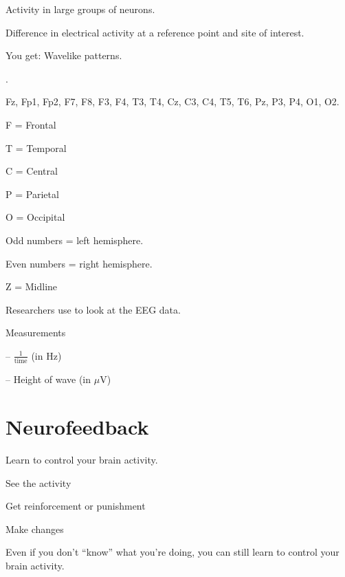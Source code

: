\begin{coloredlist}
    \item Activity in large groups of neurons.
    \item Difference in electrical activity at a reference point and site of interest.
    \item You get: Wavelike patterns.
    \item {}.
    \begin{coloredlist}
        \item Fz, Fp1, Fp2, F7, F8, F3, F4, T3, T4, Cz, C3, C4, T5, T6, Pz, P3, P4, O1, O2.
        \begin{multicols}{2}
            \begin{coloredlist}
                \item F = Frontal
                \item T = Temporal
                \item C = Central
                \item P = Parietal
                \item O = Occipital
                \item Odd numbers = left hemisphere.
                \item Even numbers = right hemisphere.
                \item Z = Midline
            \end{coloredlist}
        \end{multicols}
    \end{coloredlist}
    \item Researchers use  to look at the EEG data.
    \item Measurements
    \begin{coloredlist}
        \item {} -- \(\frac{1}{\text{time}}\) (in Hz)
        \item {} -- Height of wave (in \(\mu \text{V}\))
    \end{coloredlist}
\end{coloredlist}

\section*{Neurofeedback}

\begin{coloredlist}
    \item Learn to control your brain activity.
    \begin{coloredlist}
        \item See the activity
        \item Get reinforcement or punishment
        \item Make changes
        \item Even if you don't ``know'' what you're doing, you can still learn to control your brain activity.
    \end{coloredlist}
\end{coloredlist}

